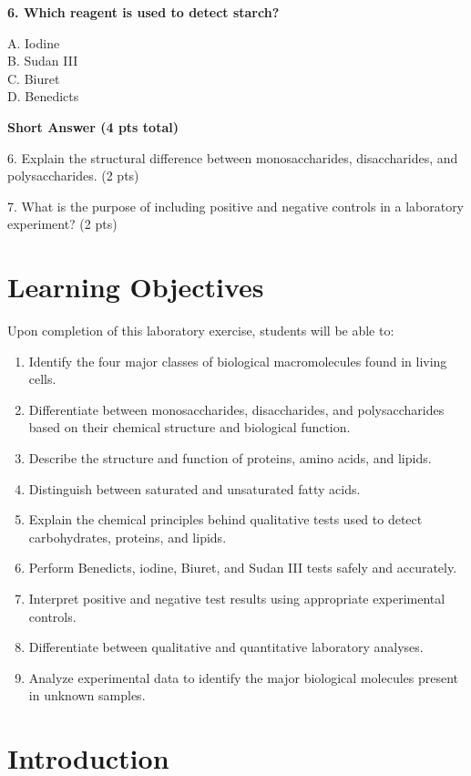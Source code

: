 \documentclass[
  letterpaper,
  DIV=11,
  numbers=noendperiod]{scrreprt}
\begin{document}
\textbf{6. Which reagent is used to detect starch?}

A. Iodine\\
B. Sudan III\\
C. Biuret\\
D. Benedict\textquotesingle s

\textbf{Short Answer (4 pts total)}

6. Explain the structural difference between monosaccharides,
disaccharides, and polysaccharides. (2 pts)

7. What is the purpose of including positive and negative controls in a
laboratory experiment? (2 pts)

\section{\texorpdfstring{\textbf{Learning
Objectives}}{Learning Objectives}}\label{learning-objectives-1}

Upon completion of this laboratory exercise, students will be able to:

\begin{enumerate}
\def\labelenumi{\arabic{enumi}.}
\item
  Identify the four major classes of biological macromolecules found in
  living cells.
\item
  Differentiate between monosaccharides, disaccharides, and
  polysaccharides based on their chemical structure and biological
  function.
\item
  Describe the structure and function of proteins, amino acids, and
  lipids.
\item
  Distinguish between saturated and unsaturated fatty acids.
\item
  Explain the chemical principles behind qualitative tests used to
  detect carbohydrates, proteins, and lipids.
\item
  Perform Benedict\textquotesingle s, iodine, Biuret, and Sudan III
  tests safely and accurately.
\item
  Interpret positive and negative test results using appropriate
  experimental controls.
\item
  Differentiate between qualitative and quantitative laboratory
  analyses.
\item
  Analyze experimental data to identify the major biological molecules
  present in unknown samples.
\end{enumerate}

\section{\texorpdfstring{\textbf{Introduction}}{Introduction}}\label{introduction-2}
\end{document}
